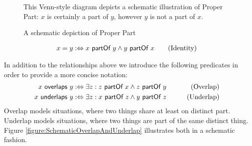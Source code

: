 \begin{figure}[h!]
\begin{center}
\end{center}
{
\scriptsize 
This Venn-style diagram depicts a schematic illustration of Proper Part:
$x$ is certainly a part of $y$, however $y$ is not a part of $x$.
}
\caption{A schematic depiction of Proper Part}
\label{figure:SchematicProperPart}
\end{figure}

\begin{align}
x = y
:\Leftrightarrow
x ~\textsf{partOf}~ y \wedge y ~\textsf{partOf}~ x
\qquad \text{(Identity)}
\end{align}

In addition to the relationships above we introduce the following predicates in order to provide a more concise notation:
\begin{align}
x ~\textsf{overlaps}~ y
&:\Leftrightarrow
\exists z : z ~\textsf{partOf}~ x \wedge z ~\textsf{partOf}~ y
&\qquad \text{(Overlap)}
\label{definition:Overlap}
\\
x ~\textsf{underlaps}~ y
&:\Leftrightarrow
\exists z : x ~\textsf{partOf}~ z \wedge y ~\textsf{partOf}~ z
&\qquad \text{(Underlap)}
\label{definition:Underlap}
\end{align}
Overlap models situations, where two things share at least on distinct part.
Underlap models situations, where two things are part of the same distinct thing.
Figure \ref{figure:SchematicOverlapAndUnderlap} illustrates both in a schematic fashion.

